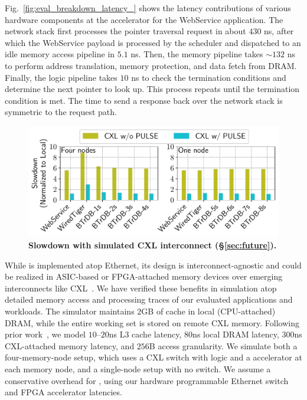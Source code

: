 Fig.~\ref{fig:eval_breakdown_latency_} shows the latency contributions of various hardware components at the \pulse accelerator for the WebService application. The network stack first processes the pointer traversal request in about $430$ ns, after which the WebService payload is processed by the scheduler and dispatched to an idle memory access pipeline in $5.1$ ns. Then, the memory pipeline takes $\sim$$132$ ns to perform address translation, memory protection, and data fetch from DRAM. Finally, the logic pipeline takes $10$ ns to check the termination conditions and determine the next pointer to look up. This process repeats until the termination condition is met. The time to send a response back over the network stack is symmetric to the request path.












\begin{figure}[t]
\centering
\includegraphics[width=0.9\columnwidth]{fig/pulse/cxl.pdf}
\vspace{-1em}
\caption[Slowdown with simulated CXL interconnect]{\textbf{Slowdown with simulated CXL interconnect (\S\ref{sec:future}).} }

\label{fig:eval_cxl}
\end{figure}

While \pulse is implemented atop Ethernet, its design is interconnect-agnostic and could be realized in ASIC-based or FPGA-attached memory devices over emerging interconnects like CXL~\cite{cxl, cxl_azure, sun2023demystifying}. We have verified these benefits in simulation atop detailed memory access and processing traces of our evaluated applications and workloads. The simulator maintains $2$GB of cache in local (CPU-attached) DRAM, while the entire working set is stored on remote CXL memory. Following prior work~\cite{pond}, we model $10$--$20$ns L3 cache latency, $80$ns local DRAM latency, $300$ns CXL-attached memory latency, and $256$B access granularity. We simulate both a four-memory-node setup, which uses a CXL switch with \pulse logic and a \pulse accelerator at each memory node, and a single-node setup with no switch. We assume a conservative overhead for \pulse, using our hardware programmable Ethernet switch and FPGA accelerator latencies.
 
